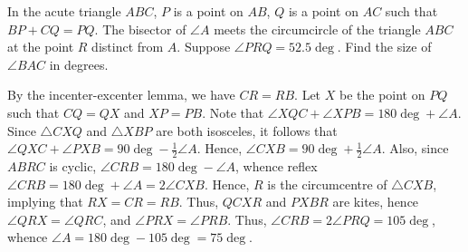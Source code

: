 \begin{question}[75]\label{A::2021-O-1-23}
    In the acute triangle $ABC$, $P$ is a point on $AB$, $Q$ is a point on $AC$ such that $BP + CQ = PQ$. The bisector of $\angle A$ meets the circumcircle of the triangle $ABC$ at the point $R$ distinct from $A$. Suppose $\angle PRQ = 52.5\deg$. Find the size of $\angle BAC$ in degrees.
\end{question}
\begin{center}
\end{center}
\begin{solution*}
    By the incenter-excenter lemma, we have $CR = RB$. Let $X$ be the point on $PQ$ such that $CQ = QX$ and $XP = PB$. Note that $\angle XQC + \angle XPB = 180\deg + \angle A$. Since $\triangle CXQ$ and $\triangle XBP$ are both isosceles, it follows that $\angle QXC + \angle PXB = 90\deg - \frac12 \angle A$. Hence, $\angle CXB = 90\deg + \frac12 \angle A$. Also, since $ABRC$ is cyclic, $\angle CRB = 180\deg - \angle A$, whence reflex $\angle CRB = 180 \deg + \angle A = 2\angle CXB$. Hence, $R$ is the circumcentre of $\triangle CXB$, implying that $RX = CR = RB$. Thus, $QCXR$ and $PXBR$ are kites, hence $\angle QRX = \angle QRC$, and $\angle PRX = \angle PRB$. Thus, $\angle CRB = 2\angle PRQ = 105\deg$, whence $\angle A = 180\deg - 105\deg = 75\deg$.
\end{solution*}

